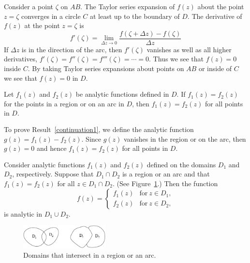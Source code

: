 Consider a point $\zeta$ on $AB$.  The Taylor series expansion of $f(z)$
about the point $z=\zeta$ converges in a circle $C$ at least up to the boundary
of $D$.  The derivative of $f(z)$ at the point $z = \zeta$ is
\[
f'(\zeta) 
= \lim_{\Delta z \to 0} \frac{f(\zeta + \Delta z) - f(\zeta)}{\Delta z}
\]
If $\Delta z$ is in the direction of the arc, then $f'(\zeta)$
vanishes as well as all higher derivatives, $f'(\zeta) = f''(\zeta) = 
f'''(\zeta) = \cdots = 0$.  Thus we see that $f(z) = 0$ inside $C$.  
By taking Taylor series expansions about points on $AB$ or inside of $C$ we
see that $f(z) = 0$ in $D$.





\begin{Result}
  \label{continuation1}
  Let $f_1(z)$ and $f_2(z)$ be analytic functions defined in $D$.  If 
  $f_1(z) = f_2(z)$ for the points in a region or on an arc in $D$, then
  $f_1(z) = f_2(z)$ for all points in $D$.  
\end{Result}


To prove Result~\ref{continuation1}, we define the 
analytic function $g(z) = f_1(z) - f_2(z)$.  Since $g(z)$ vanishes
in the region or on the arc, then $g(z) = 0$ and hence $f_1(z) = f_2(z)$
for all points in $D$.





\begin{Result}
  \label{continuation2}
  Consider analytic functions $f_1(z)$ and $f_2(z)$ defined on the 
  domains $D_1$ and $D_2$, respectively.  Suppose that $D_1 \cap D_2$ is
  a region or an arc and that $f_1(z) = f_2(z)$ for all $z \in D_1 \cap D_2$.
  (See Figure~\ref{interra}.) Then the function
  \[
  f(z) = 
  \begin{cases}
    f_1(z) &\mathrm{for}\ z \in D_1, \\
    f_2(z) &\mathrm{for}\ z \in D_2,
  \end{cases}
  \]
  is analytic in $D_1 \cup D_2$.
\end{Result}


\begin{figure}[htb!]
  \begin{center}
    \includegraphics[width=0.4\textwidth]{fcv/continuation/interra}
  \end{center}
  \caption{Domains that intersect in a region or an arc.}
  \label{interra}
\end{figure}

